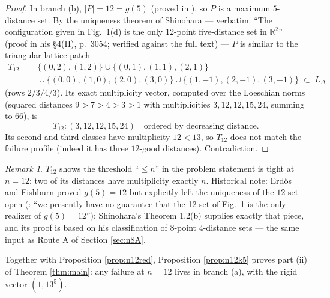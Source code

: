 \documentclass[11pt]{article}
\theoremstyle{definition}
\theoremstyle{remark}
\newtheorem{remark}[theorem]{Remark}
\newcommand{\R}{\mathbb{R}}
\newcommand{\Lat}{L_{\Delta}}
\begin{document}
\begin{proof}
In branch (b), $|P| = 12 = g(5)$ (proved in \cite[Section~4]{ErFi96}), so $P$ is a
maximum $5$-distance set. By the uniqueness theorem of Shinohara
\cite[Theorem~1.2(b), p.~3049]{Shinohara08} --- verbatim: ``The configuration given in
Fig.~1(d) is the only 12-point five-distance set in $\R^2$'' (proof in his \S4(II),
p.~3054; verified against the full text) --- $P$ is similar to the triangular-lattice
patch
\begin{align*}
T_{12} = {}& \{(0,2),(1,2)\} \cup \{(0,1),(1,1),(2,1)\} \\
& {} \cup \{(0,0),(1,0),(2,0),(3,0)\} \cup \{(1,-1),(2,-1),(3,-1)\} \;\subset\; \Lat
\end{align*}
(rows $2/3/4/3$). Its exact multiplicity vector, computed over the Loeschian norms
(squared distances $9 > 7 > 4 > 3 > 1$ with multiplicities $3, 12, 12, 15, 24$, summing
to $66$), is
\[
T_{12} : (3, 12, 12, 15, 24) \quad\text{ordered by decreasing distance.}
\]
Its second and third classes have multiplicity $12 < 13$, so $T_{12}$ does not match
the failure profile (indeed it has three $12$-good distances). Contradiction.
\end{proof}

\begin{remark}
$T_{12}$ shows the threshold ``$\le n$'' in the problem statement is tight at $n = 12$:
two of its distances have multiplicity exactly $n$. Historical note: Erd\H{o}s and
Fishburn proved $g(5) = 12$ but explicitly left the uniqueness of the $12$-set open
(\cite[p.~123]{ErFi96}: ``we presently have no guarantee that the 12-set of Fig.~1 is
the only realizer of $g(5)=12$''); Shinohara's Theorem 1.2(b) supplies exactly that
piece, and its proof is based on his classification of $8$-point $4$-distance sets ---
the same input as Route A of Section \ref{sec:n8A}.
\end{remark}

Together with Proposition \ref{prop:n12red}, Proposition \ref{prop:n12k5} proves part
(ii) of Theorem \ref{thm:main}: any failure at $n = 12$ lives in branch (a), with the
rigid vector $(1, 13^5)$.
\end{document}
